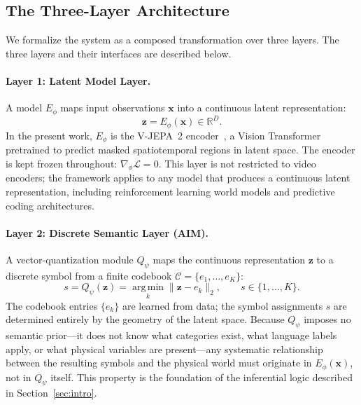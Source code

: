\documentclass{article}
\begin{document}
\subsection{The Three-Layer Architecture}
\label{sec:three_layers}

We formalize the system as a composed transformation over three
layers.
The three layers and their interfaces are described below.

\paragraph{Layer 1: Latent Model Layer.}
A model $E_\phi$ maps input observations $\mathbf{x}$ into a
continuous latent representation:
%
\begin{equation}
  \mathbf{z} = E_\phi(\mathbf{x}) \in \mathbb{R}^D.
  \label{eq:encoder}
\end{equation}
%
In the present work, $E_\phi$ is the V-JEPA~2
encoder~\cite{assran2025vjepa2}, a Vision Transformer pretrained to
predict masked spatiotemporal regions in latent space.
The encoder is kept frozen throughout: $\nabla_\phi \mathcal{L} = 0$.
This layer is not restricted to video encoders; the framework applies
to any model that produces a continuous latent representation,
including reinforcement learning world models and predictive coding
architectures.

\paragraph{Layer 2: Discrete Semantic Layer (AIM).}
A vector-quantization module $Q_\psi$ maps the continuous
representation $\mathbf{z}$ to a discrete symbol from a finite
codebook $\mathcal{C} = \{e_1, \ldots, e_K\}$:
%
\begin{equation}
  s = Q_\psi(\mathbf{z})
    = \operatorname*{arg\,min}_{k} \| \mathbf{z} - e_k \|_2,
  \qquad s \in \{1, \ldots, K\}.
  \label{eq:quantizer}
\end{equation}
%
The codebook entries $\{e_k\}$ are learned from data; the symbol
assignments $s$ are determined entirely by the geometry of the latent
space.
Because $Q_\psi$ imposes no semantic prior---it does not know what
categories exist, what language labels apply, or what physical
variables are present---any systematic relationship between the
resulting symbols and the physical world must originate in
$E_\phi(\mathbf{x})$, not in $Q_\psi$ itself.
This property is the foundation of the inferential logic described in
Section~\ref{sec:intro}.
\end{document}
